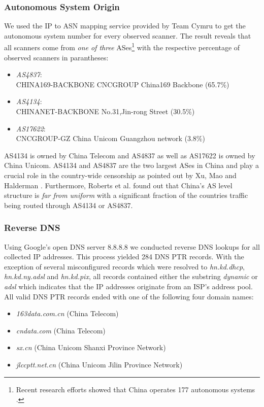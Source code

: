 \documentclass[runningheads,a4paper]{llncs}
\begin{document}
\subsubsection{Autonomous System Origin}
We used the IP to ASN mapping service provided by Team Cymru \cite{ip2asn} to get the autonomous
system number for every observed scanner. The result reveals that all scanners come from \emph{one
of three} ASes\footnote{Recent research efforts showed that China operates 177 autonomous systems
\cite{Roberts2011}.} with the respective percentage of observed scanners in parantheses:
\begin{itemize}
	\item \emph{AS4837}:\\CHINA169-BACKBONE CNCGROUP China169 Backbone (65.7\%)
	\item \emph{AS4134}:\\CHINANET-BACKBONE No.31,Jin-rong Street (30.5\%)
	\item \emph{AS17622}:\\CNCGROUP-GZ China Unicom Guangzhou network (3.8\%)
\end{itemize}

AS4134 is owned by China Telecom and AS4837 as well as AS17622 is owned by China Unicom. AS4134 and
AS4837 are the two largest ASes in China \cite{Roberts2011} and play a crucial role in the
country-wide censorship as pointed out by Xu, Mao and Halderman \cite{Xu2011}. Furthermore, Roberts
et al. \cite{Roberts2011} found out that China's AS level structure is \emph{far from uniform} with
a significant fraction of the countries traffic being routed through AS4134 or AS4837.

\subsubsection{Reverse DNS}
Using Google's open DNS server 8.8.8.8 we conducted reverse DNS lookups for all collected IP
addresses. This process yielded 284 DNS PTR records. With the exception of several misconfigured
records which were resolved to \emph{hn.kd.dhcp}, \emph{hn.kd.ny.adsl} and \emph{hn.kd.pix}, all
records contained either the substring \emph{dynamic} or \emph{adsl} which indicates that the IP
addresses originate from an ISP's address pool. All valid DNS PTR records ended with one of the
following four domain names:
\begin{itemize}
	\item \emph{163data.com.cn} (China Telecom)
	\item \emph{cndata.com} (China Telecom)
	\item \emph{sx.cn} (China Unicom Shanxi Province Network)
	\item \emph{jlccptt.net.cn} (China Unicom Jilin Province Network)
\end{itemize}
\end{document}

